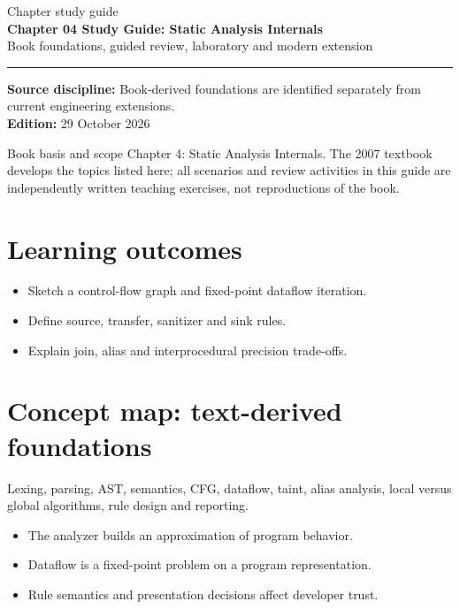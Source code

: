 \documentclass[10pt,letterpaper]{article}
\begin{document}
\hypersetup{pageanchor=false}%
\begin{titlepage}
\vspace*{1.0in}
{\color{bluegray}\Large Chapter study guide}\\[1.0em]
{\color{navy}\Huge\bfseries Chapter 04 Study Guide: Static Analysis Internals}\\[0.7em]
{\Large Book foundations, guided review, laboratory and modern extension}\\[2.0em]
\rule{\linewidth}{1.0pt}
\vfill
\textbf{Source discipline:} Book-derived foundations are identified separately from current engineering extensions.\\
\textbf{Edition:} 29 October 2026
\end{titlepage}\hypersetup{pageanchor=true}
\tableofcontents
\clearpage
\begin{focusbox}{Book basis and scope}
Chapter 4: Static Analysis Internals. The 2007 textbook develops the topics listed here; all scenarios and review activities in this guide are independently written teaching exercises, not reproductions of the book.\end{focusbox}
\section{Learning outcomes}
\begin{itemize}
\item Sketch a control-flow graph and fixed-point dataflow iteration.
\item Define source, transfer, sanitizer and sink rules.
\item Explain join, alias and interprocedural precision trade-offs.
\end{itemize}

\section{Concept map: text-derived foundations}
Lexing, parsing, AST, semantics, CFG, dataflow, taint, alias analysis, local versus global algorithms, rule design and reporting.
\begin{itemize}
\item The analyzer builds an approximation of program behavior.
\item Dataflow is a fixed-point problem on a program representation.
\item Rule semantics and presentation decisions affect developer trust.
\end{itemize}
\end{document}
